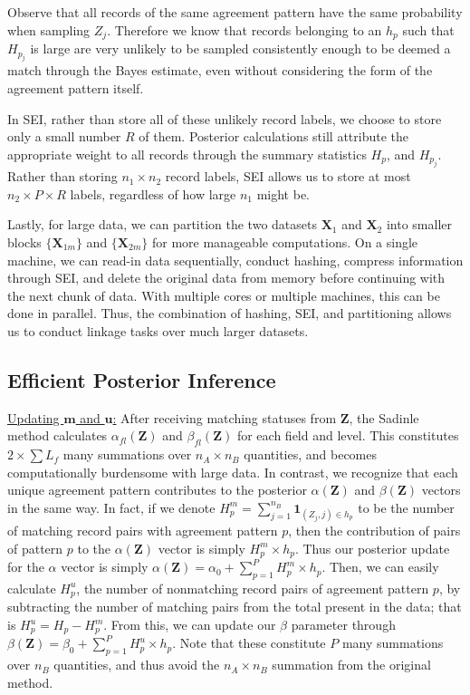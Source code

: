 \documentclass[12pt,letterpaper]{article}
\newcommand{\1}[1]{\mathbb{I}\!\left[#1\right]} %
\begin{document}
Observe that all records of the same
agreement pattern have the same probability when sampling \(Z_j\).
Therefore we know that records belonging to an \(h_p\) such that
\(H_{p_j}\) is large are very unlikely to be sampled consistently enough
to be deemed a match through the Bayes estimate, even without
considering the form of the agreement pattern itself.

In SEI, rather than store all of these unlikely record labels, we choose
to store only a small number \(R\) of them. Posterior calculations still
attribute the appropriate weight to all records through the summary
statistics \(H_p\), and \(H_{p_j}\). Rather than storing
\(n_1 \times n_2\) record labels, SEI allows us to store at most
\(n_2 \times P \times R\) labels, regardless of how large \(n_1\) might be.

Lastly, for large data, we can partition the two datasets \(\bm{X}_1\) and
\(\bm{X}_2\) into smaller blocks \(\{\bm{X}_{1m}\}\) and \(\{\bm{X}_{2m}\}\) for more
manageable computations. On a single machine, we can read-in data
sequentially, conduct hashing, compress information through SEI, and
delete the original data from memory before continuing with the next
chunk of data. With multiple cores or multiple machines, this can be
done in parallel. Thus, the combination of hashing, SEI, and partitioning
allows us to conduct linkage tasks over much larger datasets.

\hypertarget{efficient-posterior}{%
	\subsection{Efficient Posterior Inference }\label{efficient-posterior}}

\underline{Updating $\mathbf{m}$ and $\mathbf{u}$:} After receiving
matching statuses from \(\mathbf{Z}\), the Sadinle method calculates
\(\alpha_{fl}(\mathbf{Z})\) and \(\beta_{fl}(\mathbf{Z})\) for each
field and level. This constitutes \(2 \times \sum L_f\) many summations
over \(n_A \times n_B\) quantities, and becomes computationally
burdensome with large data. In contrast, we recognize that each unique
agreement pattern contributes to the posterior \(\alpha(\mathbf{Z})\)
and \(\beta(\mathbf{Z})\) vectors in the same way. In fact, if we denote
\(H_p^m = \sum_{j=1}^{n_B} \mathbf{1}_{(Z_j, j) \in h_p}\) to be the
number of matching record pairs with agreement pattern \(p\), then the
contribution of pairs of pattern \(p\) to the \(\alpha(\mathbf{Z})\)
vector is simply \(H_p^m \times h_p\). Thus our posterior update for the
\(\alpha\) vector is simply
\(\alpha(\mathbf{Z}) = \alpha_0 + \sum_{p=1}^P H_p^m \times h_p\). Then,
we can easily calculate \(H_p^u\), the number of nonmatching record
pairs of agreement pattern \(p\), by subtracting the number of matching
pairs from the total present in the data; that is
\(H_p^u = H_p - H_p^m\). From this, we can update our \(\beta\)
parameter through
\(\beta(\mathbf{Z}) = \beta_0 + \sum_{p=1}^P H_p^u \times h_p\). Note
that these constitute \(P\) many summations over \(n_B\) quantities, and
thus avoid the \(n_A \times n_B\) summation from the original method.
\end{document}
